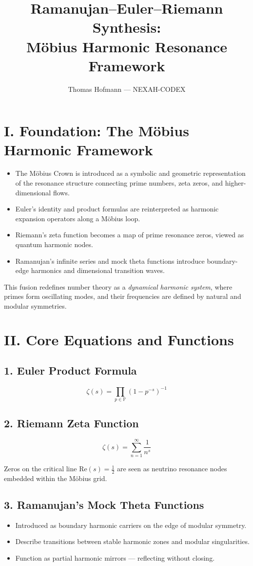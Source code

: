 \documentclass[12pt]{article}
\title{Ramanujan--Euler--Riemann Synthesis:\\Möbius Harmonic Resonance Framework}
\author{Thomas Hofmann --- NEXAH-CODEX}
\date{}
\begin{document}
\maketitle

\section*{I. Foundation: The Möbius Harmonic Framework}
\begin{itemize}
    \item The Möbius Crown is introduced as a symbolic and geometric representation of the resonance structure connecting prime numbers, zeta zeros, and higher-dimensional flows.
    \item Euler’s identity and product formulas are reinterpreted as harmonic expansion operators along a Möbius loop.
    \item Riemann’s zeta function becomes a map of prime resonance zeros, viewed as quantum harmonic nodes.
    \item Ramanujan’s infinite series and mock theta functions introduce boundary-edge harmonics and dimensional transition waves.
\end{itemize}

\bigskip
\noindent
This fusion redefines number theory as a \textit{dynamical harmonic system}, where primes form oscillating modes, and their frequencies are defined by natural and modular symmetries.

\section*{II. Core Equations and Functions}
\subsection*{1. Euler Product Formula}
\[
\zeta(s) = \prod_{p \in \mathbb{P}} \left(1 - p^{-s} \right)^{-1}
\]

\subsection*{2. Riemann Zeta Function}
\[
\zeta(s) = \sum_{n=1}^{\infty} \frac{1}{n^s}
\]

\noindent
Zeros on the critical line $\text{Re}(s) = \frac{1}{2}$ are seen as neutrino resonance nodes embedded within the Möbius grid.

\subsection*{3. Ramanujan’s Mock Theta Functions}
\begin{itemize}
    \item Introduced as boundary harmonic carriers on the edge of modular symmetry.
    \item Describe transitions between stable harmonic zones and modular singularities.
    \item Function as partial harmonic mirrors — reflecting without closing.
\end{itemize}
\end{document}
